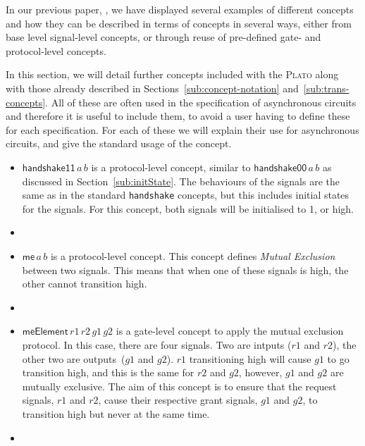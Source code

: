 \documentclass[british,conference,compsoc]{IEEEtran}
\newcommand{\noun}[1]{\textsc{#1}}
\begin{document}
In our previous paper, \cite{2015_Beaumont_MEMOCODE}, we have displayed several
examples of different concepts and how they can be described in terms of 
concepts in several ways, either from base level signal-level concepts, or 
through reuse of pre-defined gate- and protocol-level concepts.

In this section, we will detail further concepts included with the \noun{Plato}
along with those already described in Sections~\ref{sub:concept-notation} 
and~\ref{sub:trans-concepts}. All of these are often used in the specification 
of asynchronous circuits and therefore it is useful to include them, to avoid a 
user having to define these for each specification. For each of these we will 
explain their use for asynchronous circuits, and give the standard usage of the 
concept. 

\begin{itemize}
  
  \item $\mathsf{handshake11}\,a \,b$ is a protocol-level concept, similar to 
  $\mathsf{handshake00}\,a \,b$ as discussed in Section~\ref{sub:initState}. 
  The behaviours of the signals are the same as in the standard 
  \texttt{handshake} concepts, but this includes initial states for the 
   signals. For this concept, both signals will be initialised to 1, or high.
\vspace{-4mm}  
  \item []
  
  \item $\mathsf{me}\,a \,b$ is a protocol-level concept. This concept defines 
  \emph{Mutual Exclusion} between two signals. This means that when one 
  of these signals is high, the other cannot transition high.
\vspace{-4mm}
  \item []
  
  \item $\mathsf{meElement}\,r1\,r2\,g1\,g2$ is a gate-level concept to 
  apply the mutual exclusion protocol. In this case, there are four signals. 
  Two are intputs ($r1$ and $r2$), the other two are 
  outputs~($g1$ and $g2$). $r1$ transitioning high will cause $g1$ to go
  transition high, and this is the same for $r2$ and $g2$, however,
  $g1$ and $g2$ are mutually exclusive. The aim of this concept is to 
  ensure that the request signals, $r1$ and $r2$, cause their respective
  grant signals, $g1$ and $g2$, to transition high but never at the same 
  time. 
\vspace{-4mm}
  \item []
  

\end{itemize}
\end{document}
